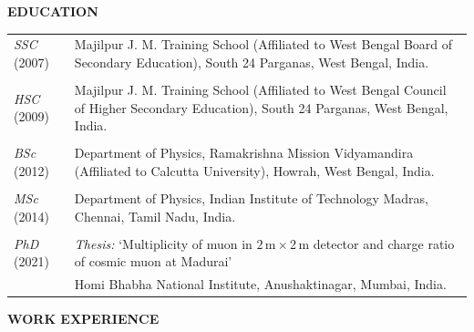 \documentclass[12pt]{article}
\begin{document}
\vspace{2cm}
\colorbox{gray!40}{\begin{minipage}{17.5cm}
\bf { EDUCATION} 
\end{minipage} }

\vspace{0.4cm}
\begin{tabular}{p{3cm} p{14cm} }

  {\emph{SSC} (2007)} & Majilpur J. M. Training School (Affiliated to West Bengal Board of Secondary Education), South 24 Parganas, West Bengal, India. \\
  & \\
  {\emph{HSC} (2009)} & Majilpur J. M. Training School (Affiliated to West Bengal Council of Higher Secondary Education), South 24 Parganas, West Bengal, India. \\
  & \\
  {\emph{BSc} (2012)} & Department of Physics, Ramakrishna Mission Vidyamandira (Affiliated to Calcutta University), Howrah, West Bengal, India.\\
  & \\
  {\emph{MSc} (2014)} & Department of Physics, Indian Institute of Technology Madras, Chennai, Tamil Nadu, India.\\
  & \\
  {\emph{PhD} (2021)} &  \emph{Thesis:} `Multiplicity of muon in $2$\,m\,$\times$\,2\,m detector and charge ratio of cosmic muon at Madurai'\\
  \vspace{0.2cm}
  & Homi Bhabha National Institute, Anushaktinagar, Mumbai, India.%
  

\end{tabular}

\pagebreak
\vspace{0.5cm}
\colorbox{gray!40}{\begin{minipage}{17.5cm}
\bf {WORK EXPERIENCE } 
\end{minipage} }
\end{document}
